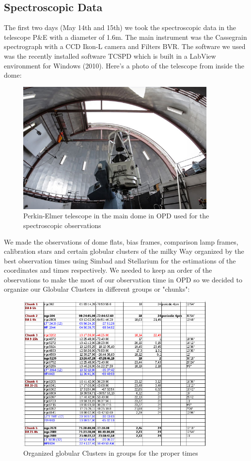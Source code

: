 \subsection{Spectroscopic Data}

The first two days (May 14th and 15th) we took the spectroscopic data in the telescope P\&E with a diameter of 1.6m. The main instrument was the Cassegrain spectrograph with a CCD Ikon-L camera and Filters BVR. The software we used was the recently installed software TCSPD which is built in a LabView environment for Windows (2010). Here's a photo of the telescope from inside the dome:

\begin{figure}[h]
\centering
\includegraphics[width=10cm]{images/opd-spectrograph.jpg}
\caption{Perkin-Elmer telescope in the main dome in OPD used for the spectroscopic observations}
\end{figure}

We made the observations of dome flats, bias frames, comparison lamp frames, calibration stars and certain globular clusters of the milky Way organized by the best observation times using Simbad and Stellarium for the estimations of the coordinates and times respectively. We needed to keep an order of the observations to make the most of our observation time in OPD so we decided to organize our Globular Clusters in different groups or "chunks":

\begin{figure}[h]
\centering
\includegraphics[width=10cm]{images/9.png}
\caption{Organized globular Clusters in groups for the proper times}
\end{figure}

